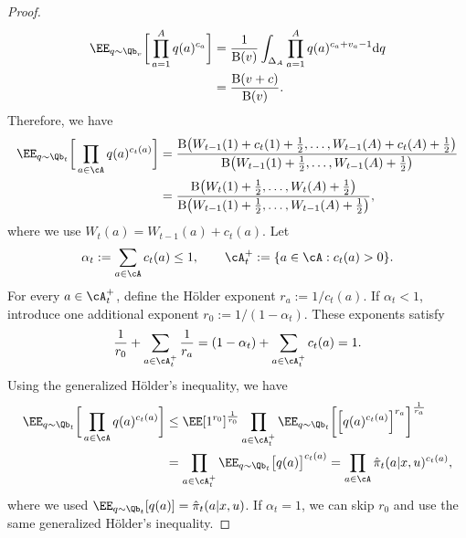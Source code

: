 \documentclass[11pt]{article}
\begin{document}
\begin{proof}
\begin{align}
\notag
    \EE_{q \sim \Qb_v}\bigg[
        \prod_{a=1}^A q(a)^{c_a}
    \bigg]
    & = \frac{1}{\mathrm B(v)}\int_{\Delta_A} \prod_{a=1}^A q(a)^{c_a + v_a-1} \mathrm dq\\
    &= \frac{\mathrm B(v+c)}{\mathrm B(v)}.
\notag
\end{align}
Therefore, we have
\begin{align}
\notag
    \EE_{q\sim \Qb_t}\bigg[
        \prod_{a\in\cA}
         q(a)^{c_t(a)}
    \bigg]
    &=
    \frac{
        \mathrm B\big(
            W_{t-1}(1) + c_t(1)+\frac12,\ldots,
            W_{t-1}(A) +c_t(A)+\frac12
        \big)
    }{
        \mathrm B\big(
            W_{t-1}(1)+\frac12,\ldots,
            W_{t-1}(A)+\frac12
        \big)
    }\\\label{eq:proof-dirichlet-moment}
    &= \frac{
        \mathrm B\big(
            W_{t}(1)+\frac12,\ldots,
            W_{t}(A)+\frac12
        \big)
    }{
        \mathrm B\big(
            W_{t-1}(1)+\frac12,\ldots,
            W_{t-1}(A)+\frac12
        \big)
    },
\end{align}
where we use $W_{t}(a)=W_{t-1}(a)+c_{t}(a)$. Let
\begin{align*}
    \alpha_t:=\sum_{a\in\cA}c_t(a)\leq1,
    \qquad
    \cA_t^+:=\{a\in\cA:c_t(a)>0\}.
\end{align*}
For every $a\in\cA_t^+$, define the H\"older exponent $r_a:={1}/{c_t(a)}$.
If $\alpha_t<1$, introduce one additional exponent $r_0 := 1/(1-\alpha_t)$. These
exponents satisfy
\begin{align*}
    \frac{1}{r_0}
    +
    \sum_{a\in\cA_t^+}\frac{1}{r_a}
    =
    (1-\alpha_t)+\sum_{a\in\cA_t^+}c_t(a)
    =
    1.
\end{align*}
Using the generalized H\"older's inequality, we have
\begin{align}
    \EE_{q\sim \Qb_t}\bigg[
        \prod_{a\in\cA}
         q(a)^{c_t(a)}
    \bigg]
    &\leq
    \EE[1^{r_0}]^{\frac{1}{r_0}}
    \prod_{a\in\cA_t^+}
    \EE_{q\sim \Qb_t}\bigg[
        \Big[ q(a)^{c_t(a)}\Big]^{r_a}
    \bigg]^{\frac{1}{r_a}}
    \notag\\
    &=
    \prod_{a\in\cA_t^+}
    \EE_{q\sim \Qb_t}\big[q(a)\big]^{c_t(a)}
    =
    \prod_{a\in\cA}
    \hat\pi_t(a|x,u)^{c_t(a)},
    \label{eq:proof-holder}
\end{align}
where we used 
$\EE_{q\sim \Qb_t}[q(a)]=\hat\pi_t(a|x,u)$. If $\alpha_t=1$, we can skip $r_0$ and use the same generalized H\"older's inequality.


\end{proof}
\end{document}
